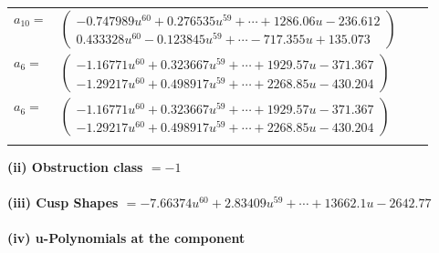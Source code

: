 \documentclass[1p]{elsarticle_modified}
\theoremstyle{definition}
\begin{document}
\begin{tabular}{m{7pt} m{180pt} m{7pt} m{180pt} }
\flushright $a_{10}=$&$\begin{pmatrix}-0.747989 u^{60}+0.276535 u^{59}+\cdots+1286.06 u-236.612\\0.433328 u^{60}-0.123845 u^{59}+\cdots-717.355 u+135.073\end{pmatrix}$ \\
\flushright $a_{6}=$&$\begin{pmatrix}-1.16771 u^{60}+0.323667 u^{59}+\cdots+1929.57 u-371.367\\-1.29217 u^{60}+0.498917 u^{59}+\cdots+2268.85 u-430.204\end{pmatrix}$\\ \flushright $a_{6}=$&$\begin{pmatrix}-1.16771 u^{60}+0.323667 u^{59}+\cdots+1929.57 u-371.367\\-1.29217 u^{60}+0.498917 u^{59}+\cdots+2268.85 u-430.204\end{pmatrix}$\\&\end{tabular}
\flushleft \textbf{(ii) Obstruction class $= -1$}\\~\\
\flushleft \textbf{(iii) Cusp Shapes $= -7.66374 u^{60}+2.83409 u^{59}+\cdots+13662.1 u-2642.77$}\\~\\
\newpage\renewcommand{\arraystretch}{1}
\flushleft \textbf{(iv) u-Polynomials at the component}\newline \\
\end{document}
